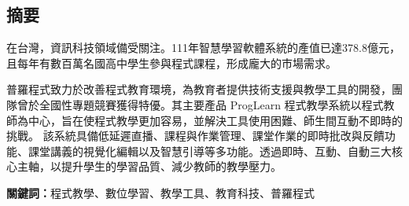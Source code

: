 \begin{center}
  \section*{摘要}
\end{center}

在台灣，資訊科技領域備受關注。111年智慧學習軟體系統的產值已達378.8億元，且每年有數百萬名國高中學生參與程式課程，形成龐大的市場需求。

普羅程式致力於改善程式教育環境，為教育者提供技術支援與教學工具的開發，團隊曾於全國性專題競賽獲得特優。其主要產品 ProgLearn 程式教學系統以程式教師為中心，旨在使程式教學更加容易，並解決工具使用困難、師生間互動不即時的挑戰。
該系統具備低延遲直播、課程與作業管理、課堂作業的即時批改與反饋功能、課堂講義的視覺化編輯以及智慧引導等多功能。透過即時、互動、自動三大核心主軸，以提升學生的學習品質、減少教師的教學壓力。
\\ \par \noindent
\textbf{關鍵詞：}程式教學、數位學習、教學工具、教育科技、普羅程式